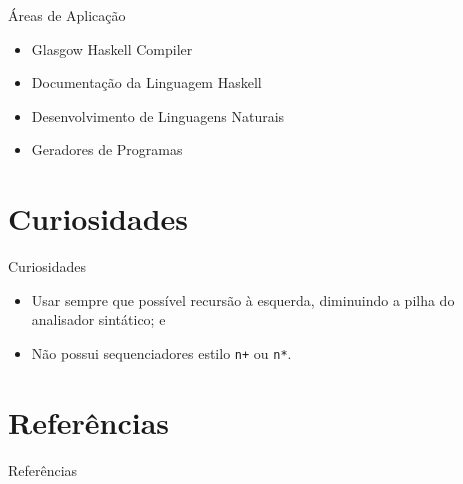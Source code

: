 \documentclass[hyperref={pdfpagelabels=false}]{beamer}
\begin{document}
\begin{frame}{Áreas de Aplicação}
    \begin{itemize}
        \item Glasgow Haskell Compiler\cite{marlow2009}
        \item Documentação da Linguagem Haskell\cite{marlow2002}
        \item Desenvolvimento de Linguagens Naturais\cite{frost2006}
        \item Geradores de Programas\cite{erwig2005}
    \end{itemize}
\end{frame}

\section{Curiosidades}

\begin{frame}[fragile]{Curiosidades}
    \begin{itemize}
        \item Usar sempre que possível recursão à esquerda, diminuindo a pilha
        do analisador sintático; e
        \item Não possui sequenciadores estilo \verb|n+| ou \verb|n*|.
    \end{itemize}
\end{frame}

\section{Referências}

\begin{frame}{Referências}
    
    
\end{frame}
\end{document}
